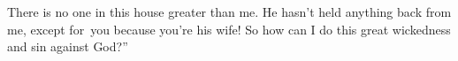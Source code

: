 
\begin{inparaenum}
     There is no one in this house greater than me. He hasn't held anything back from me, except for\understood\ you because you're his wife! So how can I do this great wickedness and sin against God?''%
\end{inparaenum}
